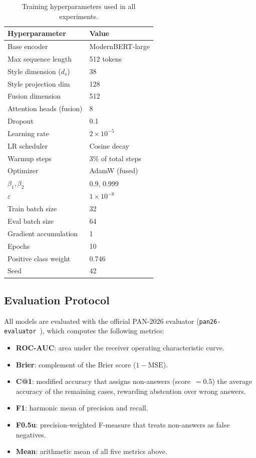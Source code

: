 \begin{table}[t]
\caption{Training hyperparameters used in all experiments.}
\label{tab:hyperparams}
\begin{tabular}{ll}
\toprule
\textbf{Hyperparameter} & \textbf{Value} \\
\midrule
Base encoder            & ModernBERT-large \\
Max sequence length     & 512 tokens \\
Style dimension ($d_s$) & 38 \\
Style projection dim    & 128 \\
Fusion dimension        & 512 \\
Attention heads (fusion)& 8 \\
Dropout                 & 0.1 \\
Learning rate           & $2 \times 10^{-5}$ \\
LR scheduler            & Cosine decay \\
Warmup steps            & 3\% of total steps \\
Optimizer               & AdamW (fused) \\
$\beta_1, \beta_2$      & 0.9, 0.999 \\
$\varepsilon$           & $1 \times 10^{-8}$ \\
Train batch size        & 32 \\
Eval batch size         & 64 \\
Gradient accumulation   & 1 \\
Epochs                  & 10 \\
Positive class weight   & 0.746 \\
Seed                    & 42 \\
\bottomrule
\end{tabular}
\end{table}

\subsection{Evaluation Protocol}

All models are evaluated with the official PAN-2026 evaluator
(\texttt{pan26-evaluator}~\cite{froebe:2023b}), which computes the following metrics:

\begin{itemize}
  \item \textbf{ROC-AUC}: area under the receiver operating characteristic curve.
  \item \textbf{Brier}: complement of the Brier score ($1 - \text{MSE}$).
  \item \textbf{C@1}: modified accuracy that assigns non-answers (score~$= 0.5$)
        the average accuracy of the remaining cases, rewarding abstention over
        wrong answers.
  \item \textbf{F1}: harmonic mean of precision and recall.
  \item \textbf{F0.5u}: precision-weighted F-measure that treats non-answers as
        false negatives.
  \item \textbf{Mean}: arithmetic mean of all five metrics above.
\end{itemize}

